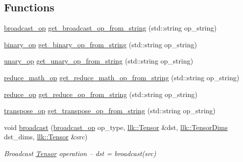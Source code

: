 \subsection*{Functions}
\begin{DoxyCompactItemize}
\item 
\hyperlink{namespacellk_1_1tensor__ops_ac43a7c3eb367c669baaa45a327aeca58}{broadcast\+\_\+op} \hyperlink{namespacellk_1_1tensor__ops_ae8a576b0f24c7afb92b7e4b22661cd1b}{get\+\_\+broadcast\+\_\+op\+\_\+from\+\_\+string} (std\+::string op\+\_\+string)
\item 
\hyperlink{namespacellk_1_1tensor__ops_a255b8a4e49bc956c2731c62bf613c0f8}{binary\+\_\+op} \hyperlink{namespacellk_1_1tensor__ops_a6ec11e5d6ad65a752a7464184a8f0b6e}{get\+\_\+binary\+\_\+op\+\_\+from\+\_\+string} (std\+::string op\+\_\+string)
\item 
\hyperlink{namespacellk_1_1tensor__ops_a5fae70cbcf6cd7aadca4a04278614633}{unary\+\_\+op} \hyperlink{namespacellk_1_1tensor__ops_afb8428deeda6bd3a1a0f2ff7518bc5fa}{get\+\_\+unary\+\_\+op\+\_\+from\+\_\+string} (std\+::string op\+\_\+string)
\item 
\hyperlink{namespacellk_1_1tensor__ops_abbf479560e4c31bec0b83feb6531552c}{reduce\+\_\+math\+\_\+op} \hyperlink{namespacellk_1_1tensor__ops_ae952831458460f89fe2cca8d82f7334b}{get\+\_\+reduce\+\_\+math\+\_\+op\+\_\+from\+\_\+string} (std\+::string op\+\_\+string)
\item 
\hyperlink{namespacellk_1_1tensor__ops_a57720b85adbe1e9b3bbab02b985f0d8d}{reduce\+\_\+op} \hyperlink{namespacellk_1_1tensor__ops_afcefdc3151ece6e39e2cb451268e85ac}{get\+\_\+reduce\+\_\+op\+\_\+from\+\_\+string} (std\+::string op\+\_\+string)
\item 
\hyperlink{namespacellk_1_1tensor__ops_a3a9aca203c5d38260a1dd35253d57ee8}{transpose\+\_\+op} \hyperlink{namespacellk_1_1tensor__ops_af559d533a9e952194483605bfd11d59e}{get\+\_\+transpose\+\_\+op\+\_\+from\+\_\+string} (std\+::string op\+\_\+string)
\item 
void \hyperlink{namespacellk_1_1tensor__ops_a95e1bfff1cd795053d5686fd418213e8}{broadcast} (\hyperlink{namespacellk_1_1tensor__ops_ac43a7c3eb367c669baaa45a327aeca58}{broadcast\+\_\+op} op\+\_\+type, \hyperlink{classllk_1_1Tensor}{llk\+::\+Tensor} \&dst, \hyperlink{structllk_1_1TensorDims}{llk\+::\+Tensor\+Dims} dst\+\_\+dims, \hyperlink{classllk_1_1Tensor}{llk\+::\+Tensor} \&src)
\begin{DoxyCompactList}\small\item\em Broadcast \hyperlink{classllk_1_1Tensor}{Tensor} operation -- dst = broadcast(src) \end{DoxyCompactList}\item 

\end{DoxyCompactItemize}
